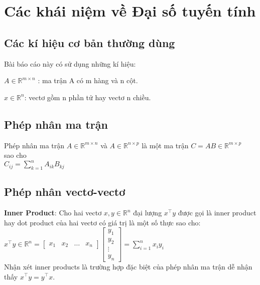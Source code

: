 \section{Các khái niệm về Đại số tuyến tính}
\subsection{Các kí hiệu cơ bản thường dùng}
Bài báo cáo này có sử dụng những kí hiệu:

$A \in \mathbb{R}^{m\times n}$	: ma trận A có m hàng và n cột.

$x \in \mathbb{R}^n$: vectơ gồm n phần tử hay vectơ n chiều.

\subsection{Phép nhân ma trận}
Phép nhân ma trận $A \in \mathbb{R}^{m\times n}$ và $A \in \mathbb{R} ^{n\times p}$ là một ma trận 
$C=AB \in \mathbb{R} ^{m\times p}$ \\sao cho \\
$C_{ij} = \sum_{k=1}^{n}A_{ik}B_{kj}$

\subsection{Phép nhân vectơ-vectơ}
\textbf{Inner Product}: Cho hai vectơ $x,y\in \mathbb{R}^n$ đại lượng $x^\top y$ được gọi là inner product hay dot product của hai vectơ có giá trị là một số thực sao cho:\\

$x^\top y \in \mathbb{R} ^{n} =
\left[\begin{matrix}x_1 & x_2 & \dots & x_n\end{matrix}\right]
\left[\begin{matrix}
y_1 \\
y_2 \\
\vdots\\
y_n
\end{matrix}\right]
=  \sum_{i=1}^{n}x_{i}y_{i}$\\
Nhận xét inner products là trường hợp đặc biệt của phép nhân ma trận dễ nhận thấy $x^\top y = y^\top x$.


